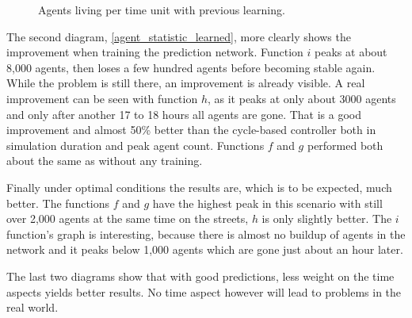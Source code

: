 \begin{figure}[ht!]
	\centering
	\label{agent_statistic_learned}
	\caption{Agents living per time unit with previous learning.}
\end{figure}

The second diagram, \autoref{agent_statistic_learned}, more clearly shows the improvement when training the prediction network. Function $i$ peaks at about 8,000 agents, then loses a few hundred agents before becoming stable again. While the problem is still there, an improvement is already visible. A real improvement can be seen with function $h$, as it peaks at only about 3000 agents and only after another 17 to 18 hours all agents are gone. That is a good improvement and almost 50\% better than the cycle-based controller both in simulation duration and peak agent count. Functions $f$ and $g$ performed both about the same as without any training.

Finally under optimal conditions the results are, which is to be expected, much better. The functions $f$ and $g$ have the highest peak in this scenario with still over 2,000 agents at the same time on the streets, $h$ is only slightly better. The $i$ function's graph is interesting, because there is almost no buildup of agents in the network and it peaks below 1,000 agents which are gone just about an hour later.

The last two diagrams show that with good predictions, less weight on the time aspects yields better results. No time aspect however will lead to problems in the real world. 


